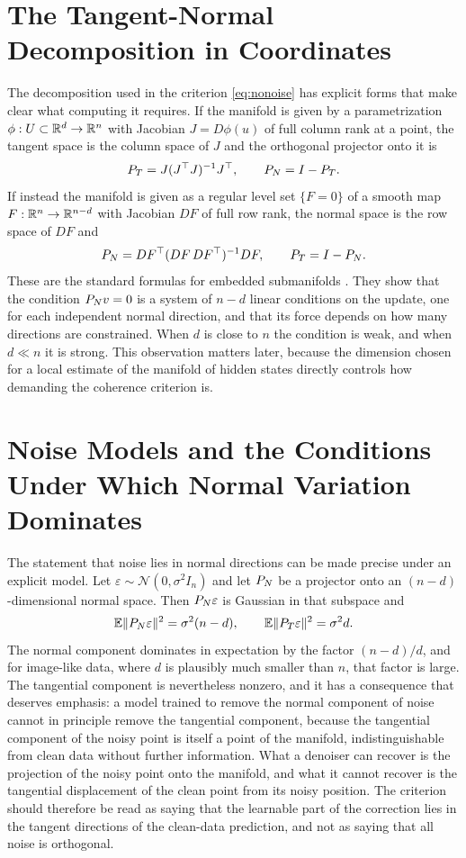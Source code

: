 \section{The Tangent-Normal Decomposition in Coordinates}

The decomposition used in the criterion \eqref{eq:nonoise} has explicit forms that make clear what computing it requires. If the manifold is given by a parametrization $\phi:U\subset\mathbb{R}^d\to\mathbb{R}^n$ with Jacobian $J=D\phi(u)$ of full column rank at a point, the tangent space is the column space of $J$ and the orthogonal projector onto it is
\[
P_{T}=J(J^{\top}J)^{-1}J^{\top},\qquad P_{N}=I-P_{T}.
\]
If instead the manifold is given as a regular level set $\{F=0\}$ of a smooth map $F:\mathbb{R}^n\to\mathbb{R}^{n-d}$ with Jacobian $DF$ of full row rank, the normal space is the row space of $DF$ and
\[
P_{N}=DF^{\top}(DF\,DF^{\top})^{-1}DF,\qquad P_{T}=I-P_{N}.
\]
These are the standard formulas for embedded submanifolds \cite{lee2013}. They show that the condition $P_{N}v=0$ is a system of $n-d$ linear conditions on the update, one for each independent normal direction, and that its force depends on how many directions are constrained. When $d$ is close to $n$ the condition is weak, and when $d\ll n$ it is strong. This observation matters later, because the dimension chosen for a local estimate of the manifold of hidden states directly controls how demanding the coherence criterion is.

\section{Noise Models and the Conditions Under Which Normal Variation Dominates}

The statement that noise lies in normal directions can be made precise under an explicit model. Let $\varepsilon\sim\mathcal N(0,\sigma^2I_n)$ and let $P_{N}$ be a projector onto an $(n-d)$-dimensional normal space. Then $P_{N}\varepsilon$ is Gaussian in that subspace and
\[
\mathbb{E}\lVert P_{N}\varepsilon\rVert^2=\sigma^2(n-d),\qquad \mathbb{E}\lVert P_{T}\varepsilon\rVert^2=\sigma^2d.
\]
The normal component dominates in expectation by the factor $(n-d)/d$, and for image-like data, where $d$ is plausibly much smaller than $n$, that factor is large. The tangential component is nevertheless nonzero, and it has a consequence that deserves emphasis: a model trained to remove the normal component of noise cannot in principle remove the tangential component, because the tangential component of the noisy point is itself a point of the manifold, indistinguishable from clean data without further information. What a denoiser can recover is the projection of the noisy point onto the manifold, and what it cannot recover is the tangential displacement of the clean point from its noisy position. The criterion should therefore be read as saying that the learnable part of the correction lies in the tangent directions of the clean-data prediction, and not as saying that all noise is orthogonal.

